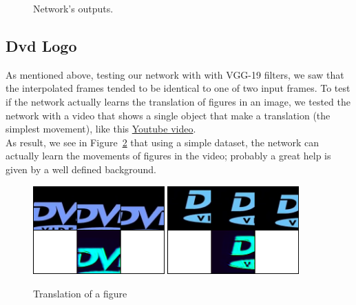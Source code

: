 \documentclass[11pt, a4paper]{article}
\begin{document}
\begin{figure}
		\caption{Network's outputs.}
		\label{output}
	\end{figure}
	
	
	\subsection{Dvd Logo}
	As mentioned above, testing our network with with VGG-19 filters, we saw that the interpolated frames tended to be identical to one of two input frames. To test if the network actually learns the translation of figures in an image, we tested the network with a video that shows a single object that make a translation (the simplest movement), like this \href{https://www.youtube.com/watch?v=5mGuCdlCcNM}{Youtube video}.\\
	As result, we see in Figure~\ref{dvd} that using a simple dataset, the network can actually learn the movements of figures in the video; probably a great help is given by a well defined background. 
	
	\begin{figure}
		\centering
		\includegraphics[width=0.45\textwidth]{dvd1}
		\includegraphics[width=0.45\textwidth]{dvd2}
		\caption{Translation of a figure}
		\label{dvd}
	\end{figure} 
	
\end{document}
